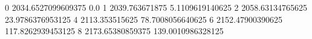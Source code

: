 0 2034.6527099609375 0.0
1 2039.763671875 5.1109619140625
2 2058.63134765625 23.9786376953125
4 2113.353515625 78.7008056640625
6 2152.47900390625 117.8262939453125
8 2173.65380859375 139.0010986328125
